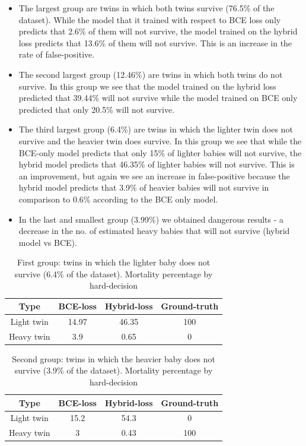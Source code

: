 \documentclass[oneside,12pt]{article}
\begin{document}
\begin{itemize}
    \item The largest group are twins in which both twins survive (76.5\% of the dataset). While the model that it trained with respect to BCE loss only predicts that 2.6\% of them will not survive, the model trained on the hybrid loss predicts that 13.6\% of them will not survive. This is an increase in the rate of false-positive.
    \item The second largest group (12.46\%) are twins in which both twins do not survive. In this group we see that the model trained on the hybrid loss predicted that 39.44\% will not survive while the model trained on BCE only predicted that only 20.5\% will not survive. 
    \item The third largest group (6.4\%) are twins in which the lighter twin does not survive and the heavier twin does survive. In this group we see that while the BCE-only model predicts that only 15\% of lighter babies will not survive, the hybrid model predicts that 46.35\% of lighter babies will not survive. This is an improvement, but again we see an increase in false-positive because the hybrid model predicts that 3.9\% of heavier babies will not survive in comparison to 0.6\% according to the BCE only model.
    \item In the last and smallest group (3.99\%) we obtained dangerous results - a decrease in the no. of estimated heavy babies that will not survive (hybrid model vs BCE). 
\end{itemize} 
%
\begin{table}[t]
\centering
 \begin{tabular}{||c | c | c | c ||}
 \hline
 Type & BCE-loss & Hybrid-loss & Ground-truth \\ [0.5ex] 
 \hline\hline
 Light twin & 14.97 & 46.35 & 100 \\ 
 \hline
 Heavy twin & 3.9 & 0.65 & 0 \\ [1ex]
 \hline
\end{tabular}
\caption{First group: twins in which the lighter baby does not survive (6.4\% of the dataset). Mortality percentage by hard-decision}
\label{tab:mort1}
\end{table}
%
%
\begin{table}[t]
\centering
 \begin{tabular}{||c | c | c | c ||}
 \hline
 Type & BCE-loss & Hybrid-loss & Ground-truth \\ [0.5ex] 
 \hline\hline
 Light twin & 15.2 & 54.3 & 0 \\ 
 \hline
 Heavy twin & 3 & 0.43 & 100 \\ [1ex]
 \hline
\end{tabular}
\caption{Second group: twins in which the heavier baby does not survive (3.9\% of the dataset). Mortality percentage by hard-decision}
\label{tab:mort2}
\end{table}
\end{document}
